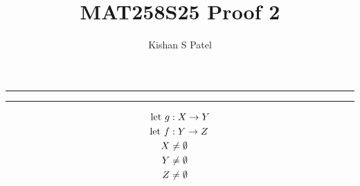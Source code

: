 \documentclass{exam}
\theoremstyle{plain}
\theoremstyle{definition}
\begin{document}
\title{MAT258S25 Proof 2}
\author{Kishan S Patel}
\maketitle

\renewcommand{\qedsymbol}{QED}

\noindent\rule{\textwidth}{1pt}


\noindent\rule{\textwidth}{1pt}

\begin{align*}
	{\text{let } } g & : X \to Y      \\
	{\text{let } } f & : Y \to Z      \\
	X       & \neq \emptyset \\
	Y       & \neq \emptyset \\
	Z       & \neq \emptyset
\end{align*}

\begin{questions}
	
	
\end{questions}
\end{document}
